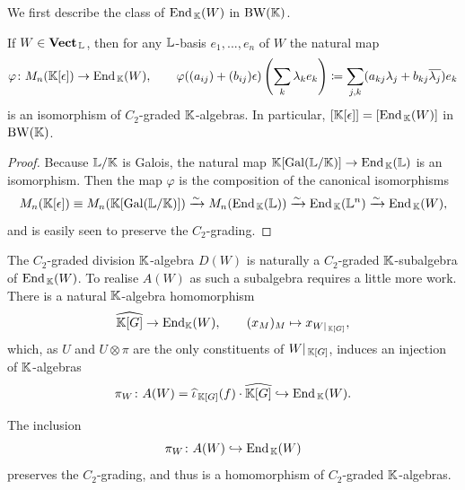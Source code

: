 We first describe the class of $\operatorname{End}_{\, {\mathbb K}}(W)$ in $\operatorname{BW}({\mathbb K})$.

\begin{lemma}
    If $W \in \operatorname{\mathbf{Vect}}_{\, {\mathbb L}}$, then for any ${\mathbb L}$-basis $e_1, ... ,e_n$ of $W$ the natural map
    \[
        \varphi \colon M_{n}({\mathbb K}[\epsilon]) \rightarrow \operatorname{End}_{\, {\mathbb K}}(W), \qquad \varphi((a_{ij}) + (b_{ij})\epsilon)\left(\sum_{k} \lambda_k e_k \right) \coloneqq \sum_{j,k} (a_{kj}\lambda_j + b_{kj} \overline{\lambda_j}) e_k
    \]
    is an isomorphism of $C_2$-graded ${\mathbb K}$-algebras. In particular, $[{\mathbb K}[\epsilon]] = [\operatorname{End}_{\, {\mathbb K}}(W)]$ in $\operatorname{BW}({\mathbb K})$.
\end{lemma}

\begin{proof}
    Because ${\mathbb L} / {\mathbb K}$ is Galois, the natural map ${\mathbb K}[\operatorname{Gal}({\mathbb L} / {\mathbb K})] \rightarrow \operatorname{End}_{\, {\mathbb K}}({\mathbb L})$ is an isomorphism. Then the map $\varphi$ is the composition of the canonical isomorphisms
    \[
    M_n({\mathbb K}[\epsilon]) \equiv M_n({\mathbb K}[\operatorname{Gal}({\mathbb L} / {\mathbb K})]) \xrightarrow{\sim} M_n(\operatorname{End}_{\, {\mathbb K}}({\mathbb L})) \xrightarrow{\sim} \operatorname{End}_{\, {\mathbb K}}({\mathbb L}^n) \xrightarrow{\sim} \operatorname{End}_{\, {\mathbb K}}(W),
    \]
    and is easily seen to preserve the $C_2$-grading.
\end{proof}

The $C_2$-graded division ${\mathbb K}$-algebra $D(W)$ is naturally a $C_2$-graded ${\mathbb K}$-subalgebra of $\operatorname{End}_{\, {\mathbb K}}(W)$. To realise $A(W)$ as such a subalgebra requires a little more work. There is a natural ${\mathbb K}$-algebra homomorphism
\[
 \widehat{{\mathbb K}[G]} \rightarrow \operatorname{End}_{{\mathbb K}}(W), \qquad (x_M)_M \mapsto x_{W|_{\, {\mathbb K}[G]}},
\]
which, as $U$ and $U \otimes \pi$ are the only constituents of $W|_{\, {\mathbb K}[G]}$, induces an injection of ${\mathbb K}$-algebras
\[
\pi_W \colon A(W) = \widehat{\iota}_{\, {\mathbb K}[G]}(f) \cdot \widehat{{\mathbb K}[G]} \hookrightarrow \operatorname{End}_{\, {\mathbb K}}(W).
\]

\begin{lemma}
    The inclusion
    \[
        \pi_W \colon A(W) \hookrightarrow \operatorname{End}_{\, {\mathbb K}}(W)
    \]
    preserves the $C_2$-grading, and thus is a homomorphism of $C_2$-graded ${\mathbb K}$-algebras.
\end{lemma}

